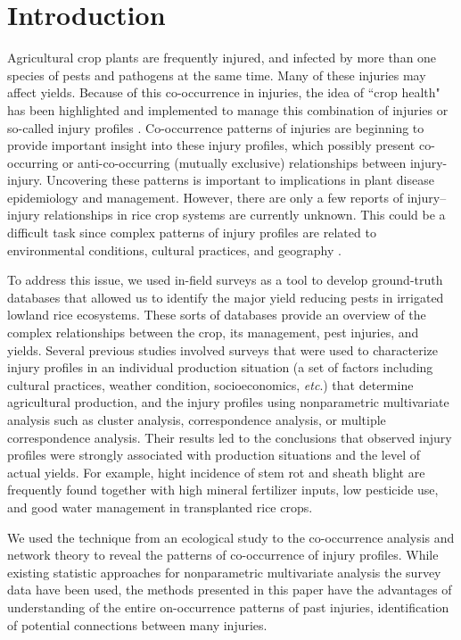 \section{Introduction}
Agricultural crop plants are frequently injured, and infected by more than one species of pests and pathogens at the same time. Many of these injuries may affect yields. Because of this co-occurrence in injuries, the idea of ``crop health" has been highlighted and implemented to manage this combination of injuries or so-called injury profiles \citep{Savary_2006}. Co-occurrence patterns of injuries are beginning to provide important insight into these injury profiles, which possibly present co-occurring or anti-co-occurring (mutually exclusive) relationships between injury-injury. Uncovering these patterns is important to implications in plant disease epidemiology and management. However, there are only a few reports of injury–injury relationships in rice crop systems are currently unknown. This could be a difficult task since complex patterns of injury profiles are related to environmental conditions, cultural practices, and geography \citep{Willocquet_2008_Simulating}.

To address this issue, we used in-field surveys as a tool to develop ground-truth databases that allowed us to identify the major yield reducing pests in irrigated lowland rice ecosystems. These sorts of databases provide an overview of the complex relationships between the crop, its management, pest injuries, and yields. Several previous studies \cite{Savary_2000_Characterization, Savary_2000_Quantification, Dong_2010_Characterization,Reddy_2011_Characterizing} involved surveys that were used to characterize injury profiles in an individual production situation (a set of factors including cultural practices, weather condition, socioeconomics, \textit{etc}.) that determine agricultural production, and the injury profiles using nonparametric multivariate analysis such as cluster analysis, correspondence analysis, or multiple correspondence analysis. Their results led to the conclusions that observed injury profiles were strongly associated with production situations and the level of actual yields. For example, hight incidence of stem rot and sheath blight are frequently found together with high mineral fertilizer inputs, low pesticide use, and good water management in transplanted rice crops.

We used the technique from an ecological study to the co-occurrence analysis and network theory to reveal the patterns of co-occurrence of injury profiles.  While existing statistic approaches for nonparametric multivariate analysis the survey data have been used, the methods presented in this paper have the advantages of understanding of the entire on-occurrence patterns of past injuries, identification of potential connections between many injuries.

